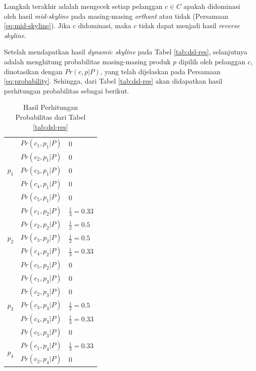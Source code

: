 Langkah terakhir adalah mengecek setiap pelanggan $c \in C$ apakah didominasi oleh hasil \textit{mid-skyline} pada masing-masing \textit{orthant} atau tidak (Persamaan \ref{eq:mid-skyline}). Jika $c$ didominasi, maka $c$ tidak dapat menjadi hasil \textit{reverse skyline}.


Setelah mendapatkan hasil \textit{dynamic skyline} pada Tabel \ref{tab:dsl-res}, selanjutnya adalah menghitung probabilitas masing-masing produk $p$ dipilih oleh pelanggan $c$, dinotasikan dengan $Pr(c, p|P)$, yang telah dijelaskan pada Persamaan \ref{eq:probability}. Sehingga, dari Tabel \ref{tab:dsl-res} akan didapatkan hasil perhitungan probabilitas sebagai berikut.

\begin{small}
	\begin{longtable}{|p{1.5cm}|p{3cm}|p{2.5cm}|}
		\caption{Hasil Perhitungan Probabilitas dari Tabel \ref{tab:dsl-res}}
		\label{tab:prob-res}
		\hline
		\multirow{5}{*}{$p_1$} & $Pr(c_1, p_1|P)$ & $0$ \\ \cline{2-3}
		& $Pr(c_2, p_1|P)$ & $0$ \\ \cline{2-3}
		& $Pr(c_3, p_1|P)$ & $0$ \\ \cline{2-3}
		& $Pr(c_4, p_1|P)$ & $0$ \\ \cline{2-3}
		& $Pr(c_5, p_1|P)$ & $0$ \\ \hline
		\multirow{5}{*}{$p_2$} & $Pr(c_1, p_2|P)$ & $\frac{1}{3} = 0.33$ \\ \cline{2-3}
		& $Pr(c_2, p_2|P)$ & $\frac{1}{2} = 0.5$ \\ \cline{2-3}
		& $Pr(c_3, p_2|P)$ & $\frac{1}{2} = 0.5$ \\ \cline{2-3}
		& $Pr(c_4, p_2|P)$ & $\frac{1}{3} = 0.33$  \\ \cline{2-3}
		& $Pr(c_5, p_2|P)$ & $0$ \\ \hline
		\multirow{5}{*}{$p_3$} & $Pr(c_1, p_3|P)$ & $0$ \\ \cline{2-3}
		& $Pr(c_2, p_3|P)$ & $0$ \\ \cline{2-3}
		& $Pr(c_3, p_3|P)$ & $\frac{1}{2} = 0.5$ \\ \cline{2-3}
		& $Pr(c_4, p_3|P)$ & $\frac{1}{3} = 0.33$  \\ \cline{2-3}
		& $Pr(c_5, p_3|P)$ & $0$ \\ \hline
		\multirow{5}{*}{$p_4$} & $Pr(c_1, p_4|P)$ & $\frac{1}{3} = 0.33$ \\ \cline{2-3}
		& $Pr(c_2, p_4|P)$ & $0$ \\ \cline{2-3}

\end{longtable}
\end{small}
